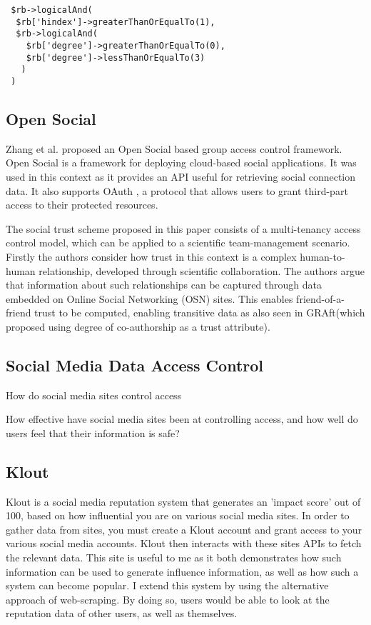 \begin{verbatim}
 $rb->logicalAnd(
  $rb['hindex']->greaterThanOrEqualTo(1),
  $rb->logicalAnd(
    $rb['degree']->greaterThanOrEqualTo(0),
    $rb['degree']->lessThanOrEqualTo(3)
   )
 )
\end{verbatim}


\subsection{Open Social}

Zhang et al. \cite{} proposed an Open Social based group access control framework. Open Social is a framework for deploying cloud-based social applications. It was used in this context as it provides an API useful for retrieving social connection data. It also supports OAuth \cite{}, a protocol that allows users to grant third-part access to their protected resources.

The social trust scheme proposed in this paper consists of a multi-tenancy access control model, which can be applied to a scientific team-management scenario. Firstly the authors consider how trust in this context is a complex human-to-human relationship, developed through scientific collaboration. The authors argue that information about such relationships can be captured through data embedded on Online Social Networking (OSN) sites. This enables friend-of-a-friend trust to be computed, enabling transitive data as also seen in GRAft(which proposed using degree of co-authorship as a trust attribute).

\subsection{Social Media Data Access Control}

How do social media sites control access

How effective have social media sites been at controlling access, and how well do users feel that their information is safe?


\subsection{Klout}

Klout \cite{} is a social media reputation system that generates an 'impact score' out of 100, based on how influential you are on various social media sites. In order to gather data from sites, you must create a Klout account and grant access to your various social media accounts. Klout then interacts with these sites APIs to fetch the relevant data. This site is useful to me as it both demonstrates how such information can be used to generate influence information, as well as how such a system can become popular. I extend this system by using the alternative approach of web-scraping. By doing so, users would be able to look at the reputation data of other users, as well as themselves. 

